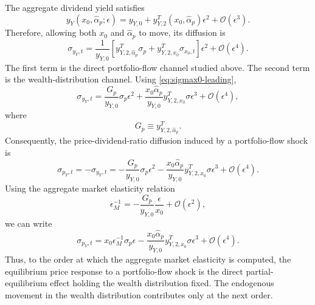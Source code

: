 The aggregate dividend yield satisfies
\begin{equation}
    y_Y(x_0,\hat{\alpha}_p;\epsilon)
    =y_{Y,0}+y_{Y,2}^{T}(x_0,\hat{\alpha}_p)\epsilon^2+\mathcal{O}(\epsilon^3).
\end{equation}
Therefore, allowing both $x_0$ and $\hat{\alpha}_p$ to move, its diffusion is
\begin{equation}\label{eq:sigmay-total-wealth-dist}
    \sigma_{y_Y,t}
    =\frac{1}{y_{Y,0}}
    \left[
        y_{Y,2,\hat{\alpha}_p}^{T}\sigma_p
        +y_{Y,2,x_0}^{T}\sigma_{x_0,t}
    \right]\epsilon^2
    +\mathcal{O}(\epsilon^4).
\end{equation}
The first term is the direct portfolio-flow channel studied above.
The second term is the wealth-distribution channel.
Using \eqref{eq:sigmax0-leading},
\begin{equation}\label{eq:sigmay-total-wealth-dist-expanded}
    \sigma_{y_Y,t}
    =\frac{G_p}{y_{Y,0}}\sigma_p\epsilon^2
    +\frac{x_0\hat{\alpha}_p}{y_{Y,0}}y_{Y,2,x_0}^{T}\sigma\epsilon^3
    +\mathcal{O}(\epsilon^4),
\end{equation}
where
\begin{equation}
    G_p\equiv y_{Y,2,\hat{\alpha}_p}^{T}.
\end{equation}
Consequently, the price-dividend-ratio diffusion induced by a portfolio-flow shock is
\begin{equation}\label{eq:sigmapY-total-wealth-dist}
    \sigma_{p_Y,t}
    =-\sigma_{y_Y,t}
    =-\frac{G_p}{y_{Y,0}}\sigma_p\epsilon^2
    -\frac{x_0\hat{\alpha}_p}{y_{Y,0}}y_{Y,2,x_0}^{T}\sigma\epsilon^3
    +\mathcal{O}(\epsilon^4).
\end{equation}
Using the aggregate market elasticity relation
\begin{equation}
    \epsilon_M^{-1}
    =-\frac{G_p}{y_{Y,0}}\frac{\epsilon}{x_0}+\mathcal{O}(\epsilon^2),
\end{equation}
we can write
\begin{equation}\label{eq:sigmapY-total-wealth-dist-elasticity}
    \sigma_{p_Y,t}
    =x_0\epsilon_M^{-1}\sigma_p\epsilon
    -\frac{x_0\hat{\alpha}_p}{y_{Y,0}}y_{Y,2,x_0}^{T}\sigma\epsilon^3
    +\mathcal{O}(\epsilon^4).
\end{equation}
Thus, to the order at which the aggregate market elasticity is computed, the equilibrium price response to a portfolio-flow shock is the direct partial-equilibrium effect holding the wealth distribution fixed.
The endogenous movement in the wealth distribution contributes only at the next order.

